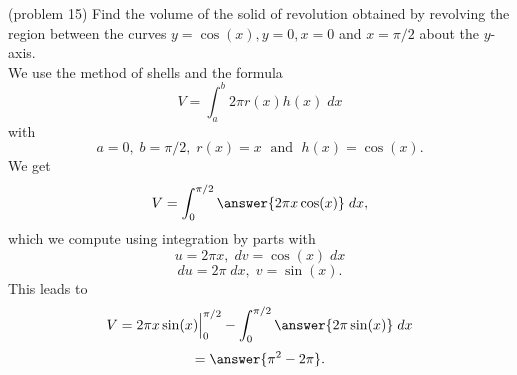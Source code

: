 \documentclass[handout]{ximera}
\begin{document}
\begin{problem}(problem 15)
Find the volume of the solid of revolution obtained by revolving the region between the curves $y = \cos(x), y = 0, x = 0$
and $x = \pi/2$ about the $y$-axis.\\


We use the method of shells and the formula
\[
V = \int_a^b 2\pi r(x)h(x) \; dx
\]
with
\[
a = 0,\; b = \pi/2, \; r(x) = x \; \text{ and } \; h(x) = \cos(x).
\]
We get
\[
V = \int_0^{\pi/2} \answer{2\pi x \cos(x)} \; dx,
\]
which we compute using integration by parts with
\[
u = 2\pi x, \; dv = \cos(x) \; dx
\]
\[
du = 2\pi \;dx, \; v = \sin(x).
\]
This leads to 
\[
V = 2\pi x\sin(x) \Big|_0^{\pi/2} - \int_0^{\pi/2} \answer{2\pi \sin(x)} \; dx
\] 
\[
= \answer{\pi^2 - 2\pi}.
\]
\end{problem} 





\begin{center}
\begin{foldable}
\end{foldable}
\end{center}
\end{document}
